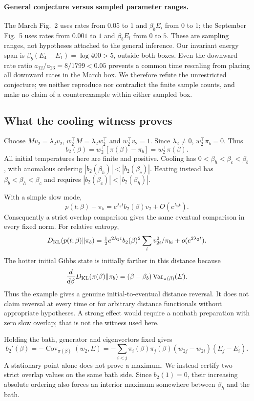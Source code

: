 \documentclass[11pt]{article}
\newcommand{\Cov}{\operatorname{Cov}}
\newcommand{\Var}{\operatorname{Var}}
\begin{document}
\paragraph{General conjecture versus sampled parameter ranges.}
The March Fig.~2 uses rates from $0.05$ to $1$ and $\beta_bE_i$ from $0$ to $1$; the September Fig.~5 uses rates from $0.001$ to $1$ and $\beta_bE_i$ from $0$ to $5$. These are sampling ranges, not hypotheses attached to the general inference. Our invariant energy span is $\beta_b(E_4-E_1)=\log400>5$, outside both boxes. Even the downward-rate ratio $a_{12}/a_{23}=8/1799<0.05$ prevents a common time rescaling from placing all downward rates in the March box. We therefore refute the unrestricted conjecture; we neither reproduce nor contradict the finite sample counts, and make no claim of a counterexample within either sampled box.

\subsection{What the cooling witness proves}\label{sec:cooling}
Choose $Mv_2=\lambda_2v_2$, $w_2^\top M=\lambda_2w_2^\top$ and $w_2^\top v_2=1$. Since $\lambda_2\ne0$, $w_2^\top\pi_b=0$. Thus
\[
b_2(\beta)=w_2^\top[\pi(\beta)-\pi_b]=w_2^\top\pi(\beta).
\]
All initial temperatures here are finite and positive. Cooling has $0<\beta_h<\beta_c<\beta_b$, with anomalous ordering $|b_2(\beta_h)|<|b_2(\beta_c)|$. Heating instead has $\beta_b<\beta_h<\beta_c$ and requires $|b_2(\beta_c)|<|b_2(\beta_h)|$.

With a simple slow mode,
\[
p(t;\beta)-\pi_b=e^{\lambda_2t}b_2(\beta)v_2+O(e^{\lambda_3t}).
\]
Consequently a strict overlap comparison gives the same eventual comparison in every fixed norm. For relative entropy,
\[
D_{\rm KL}(p(t;\beta)\Vert\pi_b)=\tfrac12e^{2\lambda_2t}b_2(\beta)^2
\sum_i v_{2i}^2/\pi_{bi}+o(e^{2\lambda_2t}).
\]
The hotter initial Gibbs state is initially farther in this distance because
\[
\frac{d}{d\beta}D_{\rm KL}(\pi(\beta)\Vert\pi_b)
=(\beta-\beta_b)\Var_{\pi(\beta)}(E).
\]
Thus the example gives a genuine initial-to-eventual distance reversal. It does not claim reversal at every time or for arbitrary distance functionals without appropriate hypotheses. A strong effect would require a nonbath preparation with zero slow overlap; that is not the witness used here.

Holding the bath, generator and eigenvectors fixed gives
\[
b_2'(\beta)=-\Cov_{\pi(\beta)}(w_2,E)
=-\sum_{i<j}\pi_i(\beta)\pi_j(\beta)(w_{2j}-w_{2i})(E_j-E_i).
\]
A stationary point alone does not prove a maximum. We instead certify two strict overlap values on the same bath side. Since $b_2(1)=0$, their increasing absolute ordering also forces an interior maximum somewhere between $\beta_h$ and the bath.
\end{document}
